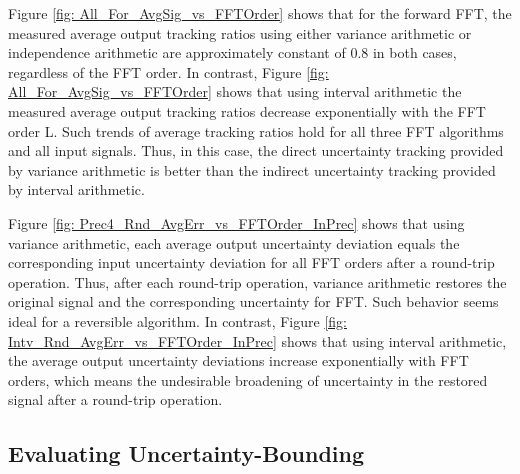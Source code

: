 \documentclass[twoside]{article}
\numberwithin{equation}{section}
\begin{document}
Figure \ref{fig: All_For_AvgSig_vs_FFTOrder} shows that for the forward FFT, the measured average output tracking ratios using either variance arithmetic or independence arithmetic are approximately constant of 0.8 in both cases, regardless of the FFT order.  In contrast, Figure \ref{fig: All_For_AvgSig_vs_FFTOrder} shows that using interval arithmetic the measured average output tracking ratios decrease exponentially with the FFT order L.  Such trends of average tracking ratios hold for all three FFT algorithms and all input signals.  Thus, in this case, the direct uncertainty tracking provided by variance arithmetic is better than the indirect uncertainty tracking provided by interval arithmetic.   

Figure \ref{fig: Prec4_Rnd_AvgErr_vs_FFTOrder_InPrec} shows that using variance arithmetic, each average output uncertainty deviation equals the corresponding input uncertainty deviation for all FFT orders after a round-trip operation.  Thus, after each round-trip operation, variance arithmetic restores the original signal and the corresponding uncertainty for FFT.  Such behavior seems ideal for a reversible algorithm.  In contrast, Figure \ref{fig: Intv_Rnd_AvgErr_vs_FFTOrder_InPrec} shows that using interval arithmetic, the average output uncertainty deviations increase exponentially with FFT orders, which means the undesirable broadening of uncertainty in the restored signal after a round-trip operation.


\subsection{Evaluating Uncertainty-Bounding }
\end{document}
